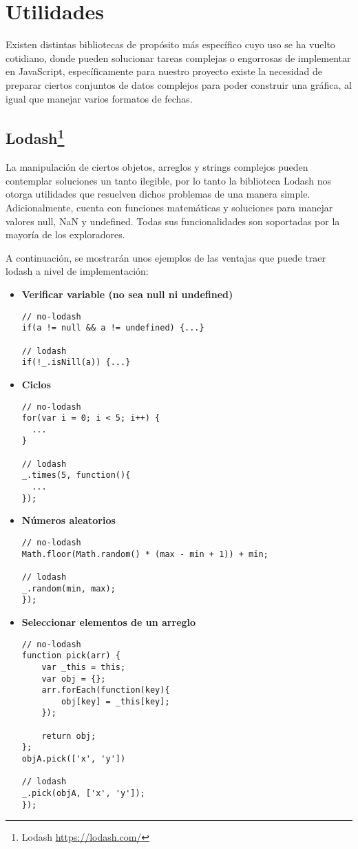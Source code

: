 \section{Utilidades}

Existen distintas bibliotecas de propósito más específico cuyo uso se ha vuelto cotidiano, donde pueden solucionar tareas complejas o engorrosas de implementar en JavaScript, específicamente para nuestro proyecto existe la necesidad de preparar ciertos conjuntos de datos complejos para poder construir una gráfica, al igual que manejar varios formatos de fechas.

\subsection[Lodash]{Lodash\footnote{Lodash \url{https://lodash.com/}}}

La manipulación de ciertos objetos, arreglos y strings complejos pueden contemplar soluciones un tanto ilegible, por lo tanto la biblioteca Lodash nos otorga utilidades que resuelven dichos problemas de una manera simple. Adicionalmente, cuenta con funciones matemáticas y soluciones para manejar valores null, NaN y undefined. Todas sus funcionalidades son soportadas por la mayoría de los exploradores.

A continuación, se mostrarán unos ejemplos de las ventajas que puede traer lodash a nivel de implementación:

\begin{itemize}
\item\textbf{Verificar variable (no sea null ni undefined)}
\begin{lstlisting}
// no-lodash
if(a != null && a != undefined) {...}

// lodash
if(!_.isNill(a)) {...}
\end{lstlisting}

\item\textbf{Ciclos}
\begin{lstlisting}
// no-lodash
for(var i = 0; i < 5; i++) {
  ...
}

// lodash
_.times(5, function(){
  ...
});
\end{lstlisting}

\item\textbf{Números aleatorios}
\begin{lstlisting}
// no-lodash
Math.floor(Math.random() * (max - min + 1)) + min;

// lodash
_.random(min, max);
});
\end{lstlisting}

\item\textbf{Seleccionar elementos de un arreglo}
\begin{lstlisting}
// no-lodash
function pick(arr) {
    var _this = this;
    var obj = {};
    arr.forEach(function(key){
        obj[key] = _this[key];
    });

    return obj;
};
objA.pick(['x', 'y'])

// lodash
_.pick(objA, ['x', 'y']);
});
\end{lstlisting}
\end{itemize}

